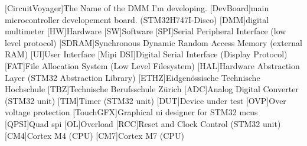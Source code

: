 \begin{acronym}
        [CircuitVoyager]{The Name of the DMM I'm developing.}
        [DevBoard]{main microcontroller developement board. (STM32H747I-Disco)}
        [DMM]{digital multimeter}
        [HW]{Hardware}
        [SW]{Software}
        [SPI]{Serial Peripheral Interface (low level protocol)}
        [SDRAM]{Synchronous Dynamic Random Access Memory (external RAM)}
        [UI]{User Interface}
        [Mipi DSI]{Digital Serial Interface (Display Protocol)}
        [FAT]{File Allocation System (Low Level Filesystem)}
        [HAL]{Hardware Abstraction Layer (STM32 Abstraction Library)}
        [ETHZ]{Eidgenössische Technische Hochschule}
        [TBZ]{Technische Berufsschule Zürich}
        [ADC]{Analog Digital Converter (STM32 unit)}
        [TIM]{Timer (STM32 unit)}
        [DUT]{Device under test}
        [OVP]{Over voltage protection}
        [TouchGFX]{Graphical \acs{ui} designer for STM32 \acs{mcu}s}
        [QPSI]{Quad \acs{spi}}
        [OL]{Overload}
        [RCC]{Reset and Clock Control (STM32 unit)}
        [CM4]{Cortex M4 (CPU)}
        [CM7]{Cortex M7 (CPU)}
\end{acronym}